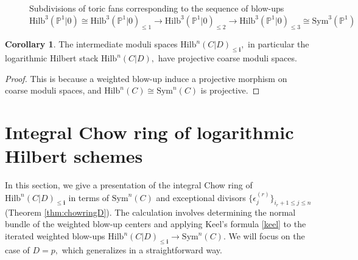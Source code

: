\documentclass[10.5pt]{amsart}
\theoremstyle{definition}
\theoremstyle{definition}
\theoremstyle{definition}
\theoremstyle{definition}
\newtheorem{corollary}[theorem]{Corollary}
\newcommand{\PP}{\mathbb{P}}
\newcommand{\Hilb}{\mathrm{Hilb}}
\newcommand{\Sym}{\mathrm{Sym}}
\newcommand{\bi}{\boldsymbol{i}}
\begin{document}
\begin{figure}[htp]
{

}


\caption{Subdivisions of toric fans corresponding to the sequence of blow-ups $\Hilb^3(\PP^1|0) \cong \Hilb^3(\PP^1|0)_{\le 1} \to \Hilb^3(\PP^1|0)_{\le 2} \to \Hilb^3(\PP^1|0)_{\le 3} \cong \Sym^3(\PP^1)$}
\label{fig:Hilb3P1}
\end{figure} 



\begin{corollary}
    The intermediate moduli spaces $\Hilb^n(C|D)_{\le \bi},$ in particular the logarithmic Hilbert stack $\Hilb^n(C|D),$ have projective coarse moduli spaces.
\end{corollary}
\begin{proof}
    This is because a weighted blow-up induce a projective morphism on coarse moduli spaces, and $\Hilb^n(C)\cong \Sym^n(C)$ is projective.
\end{proof}


\section{Integral Chow ring of logarithmic Hilbert schemes} 
In this section, we give a presentation of the integral Chow ring of $\Hilb^n(C|D)_{\le \bi}$ in terms of $\mathrm{Sym}^n(C)$ and exceptional divisors $\{\epsilon_{j}^{(r)}\}_{i_r+1\leq j\leq n}$ (Theorem \ref{thm:chowringD}). The calculation involves determining the normal bundle of the weighted blow-up centers and applying Keel's formula \ref{keel} to the iterated weighted blow-ups $\Hilb^n(C|D)_{\le \bi}\to \mathrm{Sym}^n(C)$. We will focus on the case of $D = p,$ which generalizes in a straightforward way.
\end{document}
